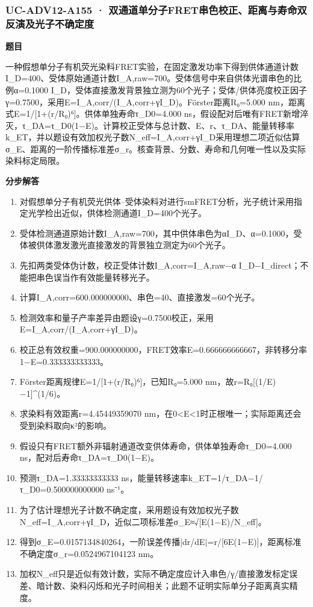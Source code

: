 \documentclass[UTF8,11pt,a4paper]{ctexart}
\begin{document}
\subsubsection*{UC-ADV12-A155 · 双通道单分子FRET串色校正、距离与寿命双反演及光子不确定度}
\noindent\textbf{题目}\par
一种假想单分子有机荧光染料FRET实验，在固定激发功率下得到供体通道计数I\_D=400、受体原始通道计数I\_A,raw=700。受体信号中来自供体光谱串色的比例α=0.1000 I\_D，受体直接激发背景独立测为60个光子；受体/供体亮度校正因子γ=0.7500，采用E=I\_A,corr/(I\_A,corr+γI\_D)。Förster距离R₀=5.000 nm，距离式E=1/[1+(r/R₀)⁶]。供体单独寿命τ\_D0=4.000 ns，假设配对后唯有FRET新增淬灭，τ\_DA=τ\_D0(1−E)。计算校正受体与总计数、E、r、τ\_DA、能量转移率k\_ET，并以题设有效加权光子数N\_eff=I\_A,corr+γI\_D采用理想二项近似估算σ\_E、距离的一阶传播标准差σ\_r。核查背景、分数、寿命和几何唯一性以及实际染料标定局限。\par
\medskip\noindent\textbf{分步解答}
\begin{enumerate}
\item 对假想单分子有机荧光供体–受体染料对进行smFRET分析，光子统计采用指定光学检出近似，供体检测通道I\_D=400个光子。
\item 受体检测通道原始计数I\_A,raw=700，其中供体串色为αI\_D、α=0.1000，受体被供体激发激光直接激发的背景独立测定为60个光子。
\item 先扣两类受体伪计数，校正受体计数I\_A,corr=I\_A,raw−α I\_D−I\_direct；不能把串色误当作有效能量转移光子。
\item 计算I\_A,corr=600.000000000、串色=40、直接激发=60个光子。
\item 检测效率和量子产率差异由题设γ=0.7500校正，采用E=I\_A,corr/(I\_A,corr+γI\_D)。
\item 校正总有效权重=900.000000000，FRET效率E=0.666666666667，非转移分率1−E=0.333333333333。
\item Förster距离规律E=1/[1+(r/R₀)⁶]，已知R₀=5.000 nm，故r=R₀[(1/E)−1]\textasciicircum{}(1/6)。
\item 求染料有效距离r=4.45449359070 nm，在0<E<1时正根唯一；实际距离还会受到染料取向κ²的影响。
\item 假设只有FRET额外非辐射通道改变供体寿命，供体单独寿命τ\_D0=4.000 ns，配对后寿命τ\_DA=τ\_D0(1−E)。
\item 预测τ\_DA=1.33333333333 ns，能量转移速率k\_ET=1/τ\_DA−1/τ\_D0=0.500000000000 ns⁻¹。
\item 为了估计理想光子计数不确定度，采用题设有效加权光子数N\_eff=I\_A,corr+γI\_D，近似二项标准差σ\_E≈√[E(1−E)/N\_eff]。
\item 得到σ\_E=0.0157134840264，一阶误差传播|dr/dE|=r/[6E(1−E)]，距离标准不确定度σ\_r=0.0524967104123 nm。
\item 加权N\_eff只是近似有效计数，实际不确定度应计入串色/γ/直接激发标定误差、暗计数、染料闪烁和光子时间相关；此题不证明实际单分子距离真实精度。
\end{enumerate}
\end{document}
